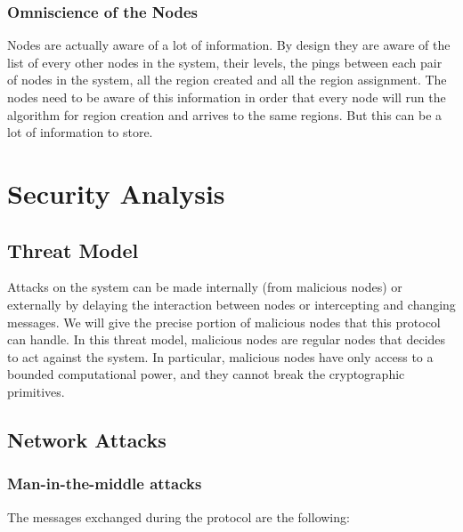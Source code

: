 \documentclass[a4paper,11pt,oneside]{report}
\begin{document}
 
\subsubsection{Omniscience of the Nodes}
Nodes are actually aware of a lot of information. By design they are aware of
the list of every other nodes in the system, their levels, the pings between
each pair of nodes in the system, all the region created and all the region
assignment. The nodes need to be aware of this information in order that
every node will run the algorithm for region creation and arrives to the same
regions. But this can be a lot of information to store.

\section{Security Analysis}

\subsection{Threat Model}
Attacks on the system can be made internally (from malicious nodes) or
externally by delaying the interaction between nodes or intercepting and
changing messages. We will give the precise portion of malicious nodes that
this protocol can handle. In this threat model, malicious nodes are regular
nodes that decides to act against the system. In particular, malicious nodes
have only access to a bounded computational power, and they cannot break the
cryptographic primitives. 

\subsection{Network Attacks} 
\subsubsection{Man-in-the-middle attacks} \label{MitM}
The messages exchanged during the protocol are the following: 
\end{document}
